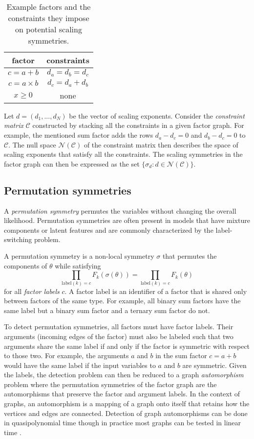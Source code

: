 \begin{table}[b]
\centering
\begin{tabular}{|c|c|}
\hline
factor & constraints \\
\hline
$c=a+b$ & $d_a = d_b = d_c$ \\
$c = a\times b$ & $d_c= d_a + d_b$ \\
$x\geq0$ & none \\
\hline
\end{tabular}
\caption{Example factors and the constraints they impose on potential scaling symmetries.}
\label{tab:scaling}
\end{table}

Let $d=(d_1,...,d_N)$ be the vector of scaling exponents. Consider the \textit{constraint matrix} $\mathcal{C}$ constructed by stacking all the constraints in a given factor graph. For example, the mentioned sum factor adds the rows $d_a-d_c=0$ and $d_b-d_c=0$ to $\mathcal{C}$. The null space $\mathcal{N}(\mathcal{C})$ of the constraint matrix then describes the space of scaling exponents that satisfy all the constraints. The scaling symmetries in the factor graph can then be expressed as the set $\{\sigma_d:d\in\mathcal{N}(\mathcal{C})\}$.


\subsection{Permutation symmetries} \label{sec:permutation}

A \textit{permutation symmetry} permutes the variables without changing the overall likelihood. Permutation symmetries are often present in models that have mixture components or latent features and are commonly characterized by the label-switching problem.

\begin{defn}
A permutation symmetry is a non-local symmetry $\sigma$ that permutes the components of $\theta$ while satisfying
\[
\prod_{\text{label}(k)=c}F_k(\sigma(\theta)) = \prod_{\text{label}(k)=c}F_k(\theta)
\]
for all \textit{factor labels} $c$. A factor label is an identifier of a factor that is shared only between factors of the same type. For example, all binary sum factors have the same label but a binary sum factor and a ternary sum factor do not.
\end{defn}

To detect permutation symmetries, all factors must have factor labels. Their arguments (incoming edges of the factor) must also be labeled such that two arguments share the same label if and only if the factor is symmetric with respect to those two. For example, the arguments $a$ and $b$ in the sum factor $c=a+b$ would have the same label if the input variables to $a$ and $b$ are symmetric. Given the labels, the detection problem can then be reduced to a graph \textit{automorphism} problem where the permutation symmetries of the factor graph are the automorphisms that preserve the factor and argument labels. In the context of graphs, an automorphism is a mapping of a graph onto itself that retains how the vertices and edges are connected. Detection of graph automorphisms can be done in quasipolynomial time \cite{Babai:2016} though in practice most graphs can be tested in linear time \cite{Babai:1980}.

